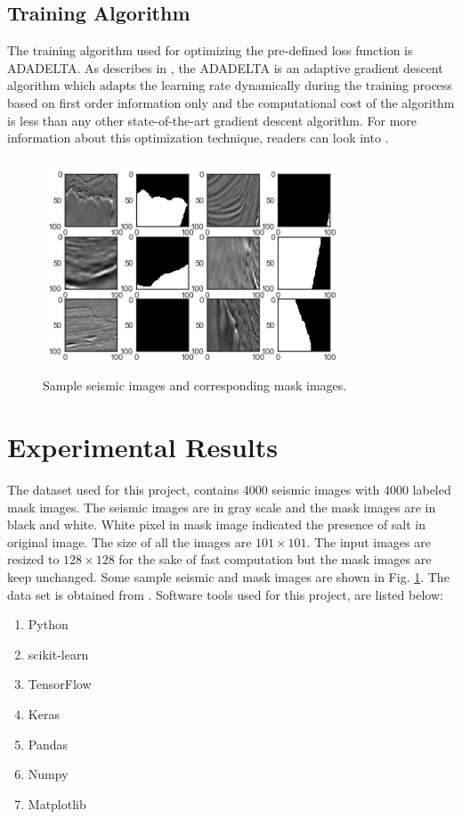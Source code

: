 \documentclass[conference]{IEEEtran}
\begin{document}
\subsection{Training Algorithm}
The training algorithm used for optimizing the pre-defined loss function is ADADELTA. As describes in \cite{zeiler2012adadelta}, the ADADELTA is an adaptive gradient descent algorithm which adapts the learning rate dynamically during the training process based on first order information only and the computational cost of the algorithm is less than any other state-of-the-art gradient descent algorithm. For more information about this optimization technique, readers can look into \cite{zeiler2012adadelta}.

\begin{figure}[!t]
	\centerline{\includegraphics[width=3.5in, height=2.5in]{dataset}}
	\caption{Sample seismic images and corresponding mask images. }
	\label{fig:dataset}
\end{figure}
\section{Experimental Results}\label{Experimental Results}
The dataset used for this project, contains 4000 seismic images with 4000 labeled mask images. The seismic images are in gray scale and the mask images are in black and white. White pixel in mask image indicated the presence of salt in original image. The size of all the images are $101\times101$. The input images are resized to $128\times128$ for the sake of fast computation but the mask images are keep unchanged. Some sample seismic and mask images are shown in Fig. \ref{fig:dataset}. The data set is obtained from \cite{tsg}. Software tools used for this project, are listed below:

\begin{enumerate}
	\item Python
	\item scikit-learn
	\item TensorFlow
	\item Keras
	\item Pandas
	\item Numpy
	\item Matplotlib
\end{enumerate}
\end{document}
